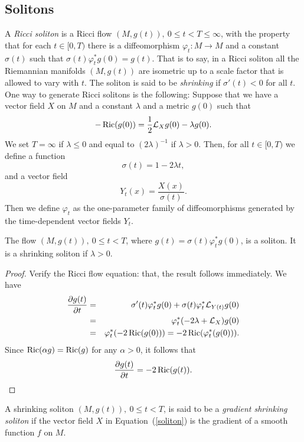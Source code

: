 \subsection{Solitons}

A {\sl Ricci soliton}
is a Ricci flow $(M,g(t)),\ 0\le t<T\le \infty$, with the property that for
each $t\in [0,T)$ there is a diffeomorphism $\varphi_t\colon M\to M$ and a
constant $\sigma(t)$ such that $\sigma(t)\varphi_t^*g(0)=g(t)$. That is to say,
in a Ricci soliton all the Riemannian manifolds $(M,g(t))$ are isometric up to
a scale factor that is allowed to vary with $t$. The soliton is said to be {\em
shrinking} if $\sigma'(t)<0$ for all $t$. One way to generate Ricci solitons is
the following: Suppose that we have a vector field $X$ on $M$ and a constant
$\lambda$ and a metric $g(0)$ such that
\begin{equation}\label{soliton}
-\operatorname{Ric}(g(0))=\frac{1}{2}{\mathcal L}_Xg(0)-\lambda g(0).
\end{equation} We set $T=\infty$ if $\lambda\le 0$ and equal to $(2\lambda)^{-1}$
if $\lambda>0$. Then, for all $t\in [0,T)$ we define a function
$$\sigma(t)=1-2\lambda t,$$
and a vector field
$$Y_t(x)=\frac{X(x)}{\sigma(t)}.$$
 Then we define $\varphi_t$ as the one-parameter
family of diffeomorphisms generated by the time-dependent vector
fields $Y_t$.
\begin{claim}\label{claim:soliton-generation}
\label{solitonclaim}


 The flow
$(M,g(t)),\ 0\le t<T$, where $g(t)=\sigma(t)\varphi_t^*g(0)$, is a soliton. It
is a shrinking soliton if $\lambda>0$.
\end{claim}

\begin{proof}
\sketch Verify the Ricci flow equation:
that, the result follows immediately. We have
\begin{eqnarray*} \frac{\partial g(t)}{\partial t} & = &
\sigma'(t)\varphi_t^*g(0)+\sigma(t)\varphi_t^*{\mathcal L}_{Y(t)}g(0)\\
& = & \varphi_t^*(-2\lambda+{\mathcal L}_X)g(0)\\
& = & \varphi_t^*(-2\operatorname{Ric}(g(0))) =-2\operatorname{Ric}(\varphi_t^*(g(0))).
\end{eqnarray*}
Since $\operatorname{Ric}(\alpha g)=\operatorname{Ric}(g)$ for any $\alpha>0$, it follows that
$$\frac{\partial g(t)}{\partial t} = -2\operatorname{Ric}(g(t)).$$
\end{proof}



\begin{definition}\label{def:gradient-shrinking-soliton}


A shrinking soliton $(M,g(t)),\ 0\le t<T$, is said to be a {\em
gradient shrinking soliton} if
the vector field $X$ in Equation~(\ref{soliton}) is the gradient of
a smooth function $f$ on $M$.
\end{definition}

